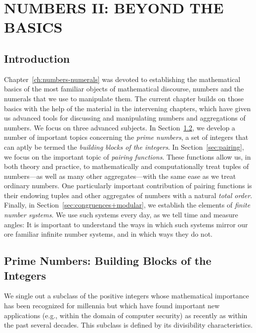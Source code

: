 
\chapter{NUMBERS II: BEYOND THE BASICS}
\label{ch:numbers-advanced}

\section{Introduction}

Chapter~\ref{ch:numbers-numerals} was devoted to establishing the
mathematical basics of the most familiar objects of mathematical
discourse, numbers and the numerals that we use to manipulate them.
The current chapter builds on those basics with the help of the
material in the intervening chapters, which have given us advanced
tools for discussing and manipulating numbers and aggregations of
numbers.  We focus on three advanced subjects.  In
Section~\ref{sec:primes}, we develop a number of important topics
concerning the {\em prime numbers}, a set of integers that can aptly
be termed the {\it building blocks of the integers}.  In
Section~\ref{sec:pairing}, we focus on the important topic of {\it
  pairing functions}.  These functions allow us, in both theory and
practice, to mathematically and computationally treat tuples of
 numbers---as well as many other aggregates---with
the same ease as we treat ordinary numbers.  One particularly
important contribution of pairing functions is their endowing tuples
and other aggregates of numbers with a natural {\em total order}.
Finally, in Section~\ref{sec:congruences+modular}, we establish the
elements of {\em finite number systems}.  We use such systems every
day, as we tell time and measure angles: It is important to understand
the ways in which such systems mirror our ore familiar infinite number
systems, and in which ways they do not.


\section{Prime Numbers: Building Blocks of the Integers}
\label{sec:primes}

We single out a subclass of the positive integers whose mathematical
importance has been recognized for millennia but which have found
important new applications (e.g., within the domain of computer
security) as recently as within the past several decades.  This
subclass is defined by its divisibility characteristics.

